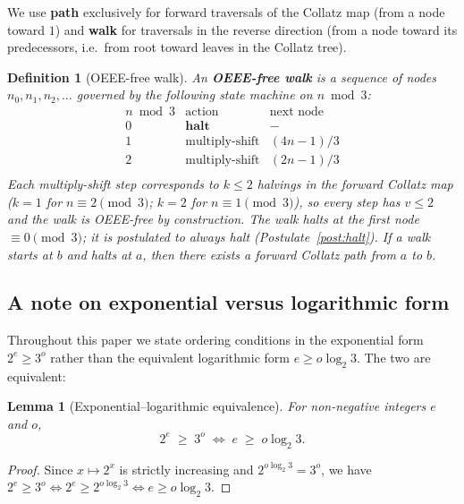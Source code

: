 \documentclass[11pt]{article}
\newtheorem{definition}{Definition}
\newtheorem{lemma}{Lemma}[section]
\begin{document}
\medskip
We use \textbf{path} exclusively for forward traversals of the Collatz map
(from a node toward $1$) and \textbf{walk} for traversals in the reverse
direction (from a node toward its predecessors, i.e.\ from root toward
leaves in the Collatz tree).

\begin{definition}[OEEE-free walk]
\label{def:walk}
An \textbf{OEEE-free walk} is a sequence of nodes $n_0, n_1, n_2, \ldots$
governed by the following state machine on $n \bmod 3$:
\[
\begin{array}{cll}
n \bmod 3 & \text{action} & \text{next node} \\
\hline
0 & \textbf{halt} & - \\
1 & \text{multiply-shift} & (4n-1)/3 \\
2 & \text{multiply-shift} & (2n-1)/3 \\
\end{array}
\]
Each multiply-shift step corresponds to $k \leq 2$ halvings in the forward
Collatz map ($k=1$ for $n\equiv 2\pmod{3}$; $k=2$ for $n\equiv 1\pmod{3}$),
so every step has $v \leq 2$ and the walk is OEEE-free by construction.
The walk halts at the first node $\equiv 0\pmod{3}$; it is postulated
to always halt (Postulate~\ref{post:halt}).  If a walk starts at $b$ and
halts at $a$, then there exists a forward Collatz path from $a$ to $b$.
\end{definition}

\subsection*{A note on exponential versus logarithmic form}

Throughout this paper we state ordering conditions in the exponential
form $2^e \geq 3^o$ rather than the equivalent logarithmic form
$e \geq o\log_2 3$.  The two are equivalent:

\begin{lemma}[Exponential--logarithmic equivalence]
\label{lem:explog}
For non-negative integers $e$ and $o$,
\[
  2^e \;\geq\; 3^o \;\iff\; e \;\geq\; o\log_2 3.
\]
\end{lemma}

\begin{proof}
Since $x \mapsto 2^x$ is strictly increasing and $2^{o\log_2 3} = 3^o$,
we have $2^e \geq 3^o \iff 2^e \geq 2^{o\log_2 3} \iff e \geq o\log_2 3$.
\end{proof}
\end{document}
